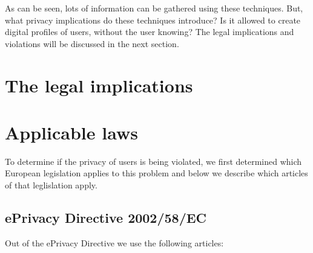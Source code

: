 \documentclass[11pt]{article}
\newcommand{\ePD}{ePrivacy Directive }
\begin{document}
As can be seen, lots of information can be gathered using these techniques. But, what privacy implications do these techniques introduce? Is it allowed to create digital profiles of users, without the user knowing? The legal implications and violations will be discussed in the next section.

\section{The legal implications}
\label{legal implications}

\section{Applicable laws}
\label{applicable laws}

To determine if the privacy of users is being violated, we first determined which European legislation applies to this problem and below we describe which articles of that leglislation apply.

\subsection{\ePD 2002/58/EC}

Out of the \ePD we use the following articles:
\end{document}
